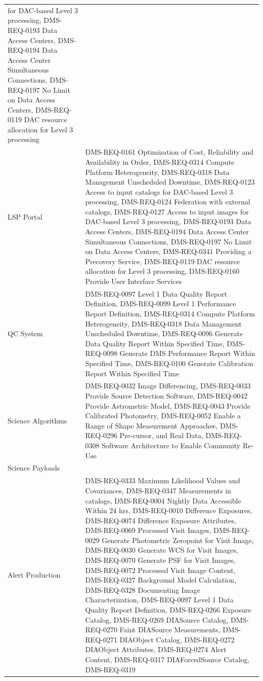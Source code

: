 \documentclass[DM,lsstdraft,toc]{lsstdoc}
\begin{document}
\begin{longtable}[]{@{}ll@{}}
for DAC-based Level 3 processing, DMS-REQ-0193 Data Access Centers,
DMS-REQ-0194 Data Access Center Simultaneous Connections, DMS-REQ-0197
No Limit on Data Access Centers, DMS-REQ-0119 DAC resource allocation
for Level 3 processing\tabularnewline
LSP Portal & DMS-REQ-0161 Optimization of Cost, Reliability and
Availability in Order, DMS-REQ-0314 Compute Platform Heterogeneity,
DMS-REQ-0318 Data Management Unscheduled Downtime, DMS-REQ-0123 Access
to input catalogs for DAC-based Level 3 processing, DMS-REQ-0124
Federation with external catalogs, DMS-REQ-0127 Access to input images
for DAC-based Level 3 processing, DMS-REQ-0193 Data Access Centers,
DMS-REQ-0194 Data Access Center Simultaneous Connections, DMS-REQ-0197
No Limit on Data Access Centers, DMS-REQ-0341 Providing a Precovery
Service, DMS-REQ-0119 DAC resource allocation for Level 3 processing,
DMS-REQ-0160 Provide User Interface Services\tabularnewline
QC System & DMS-REQ-0097 Level 1 Data Quality Report Definition,
DMS-REQ-0099 Level 1 Performance Report Definition, DMS-REQ-0314 Compute
Platform Heterogeneity, DMS-REQ-0318 Data Management Unscheduled
Downtime, DMS-REQ-0096 Generate Data Quality Report Within Specified
Time, DMS-REQ-0098 Generate DMS Performance Report Within Specified
Time, DMS-REQ-0100 Generate Calibration Report Within Specified
Time\tabularnewline
Science Algorithms & DMS-REQ-0032 Image Differencing, DMS-REQ-0033
Provide Source Detection Software, DMS-REQ-0042 Provide Astrometric
Model, DMS-REQ-0043 Provide Calibrated Photometry, DMS-REQ-0052 Enable a
Range of Shape Measurement Approaches, DMS-REQ-0296 Pre-cursor, and Real
Data, DMS-REQ-0308 Software Architecture to Enable Community
Re-Use\tabularnewline
Science Payloads &\tabularnewline
Alert Production & DMS-REQ-0333 Maximum Likelihood Values and
Covariances, DMS-REQ-0347 Measurements in catalogs, DMS-REQ-0004 Nightly
Data Accessible Within 24 hrs, DMS-REQ-0010 Difference Exposures,
DMS-REQ-0074 Difference Exposure Attributes, DMS-REQ-0069 Processed
Visit Images, DMS-REQ-0029 Generate Photometric Zeropoint for Visit
Image, DMS-REQ-0030 Generate WCS for Visit Images, DMS-REQ-0070 Generate
PSF for Visit Images, DMS-REQ-0072 Processed Visit Image Content,
DMS-REQ-0327 Background Model Calculation, DMS-REQ-0328 Documenting
Image Characterization, DMS-REQ-0097 Level 1 Data Quality Report
Definition, DMS-REQ-0266 Exposure Catalog, DMS-REQ-0269 DIASource
Catalog, DMS-REQ-0270 Faint DIASource Measurements, DMS-REQ-0271
DIAObject Catalog, DMS-REQ-0272 DIAObject Attributes, DMS-REQ-0274 Alert
Content, DMS-REQ-0317 DIAForcedSource Catalog, DMS-REQ-0319

\end{longtable}
\end{document}
